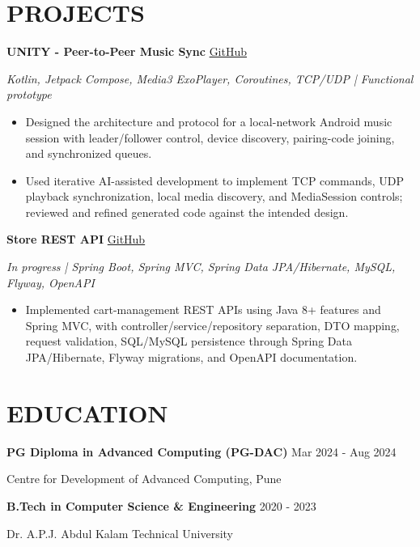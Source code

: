 \documentclass[a4paper,10pt]{article}
\begin{document}
\section{PROJECTS}
\textbf{UNITY - Peer-to-Peer Music Sync} \hfill \href{https://github.com/yugalteotia/unity-music-sync}{GitHub}\par
\textit{Kotlin, Jetpack Compose, Media3 ExoPlayer, Coroutines, TCP/UDP | Functional prototype}
\begin{itemize}
\item Designed the architecture and protocol for a local-network Android music session with leader/follower control, device discovery, pairing-code joining, and synchronized queues.
\item Used iterative AI-assisted development to implement TCP commands, UDP playback synchronization, local media discovery, and MediaSession controls; reviewed and refined generated code against the intended design.
\end{itemize}
\vspace{2pt}
\textbf{Store REST API} \hfill \href{https://github.com/yugalteotia/spring_api_starter}{GitHub}\par
\textit{In progress | Spring Boot, Spring MVC, Spring Data JPA/Hibernate, MySQL, Flyway, OpenAPI}
\begin{itemize}
\item Implemented cart-management REST APIs using Java 8+ features and Spring MVC, with controller/service/repository separation, DTO mapping, request validation, SQL/MySQL persistence through Spring Data JPA/Hibernate, Flyway migrations, and OpenAPI documentation.
\end{itemize}

\section{EDUCATION}
\textbf{PG Diploma in Advanced Computing (PG-DAC)} \hfill Mar 2024 - Aug 2024\par
Centre for Development of Advanced Computing, Pune\par
\vspace{4pt}
\textbf{B.Tech in Computer Science \& Engineering} \hfill 2020 - 2023\par
Dr. A.P.J. Abdul Kalam Technical University
\end{document}
